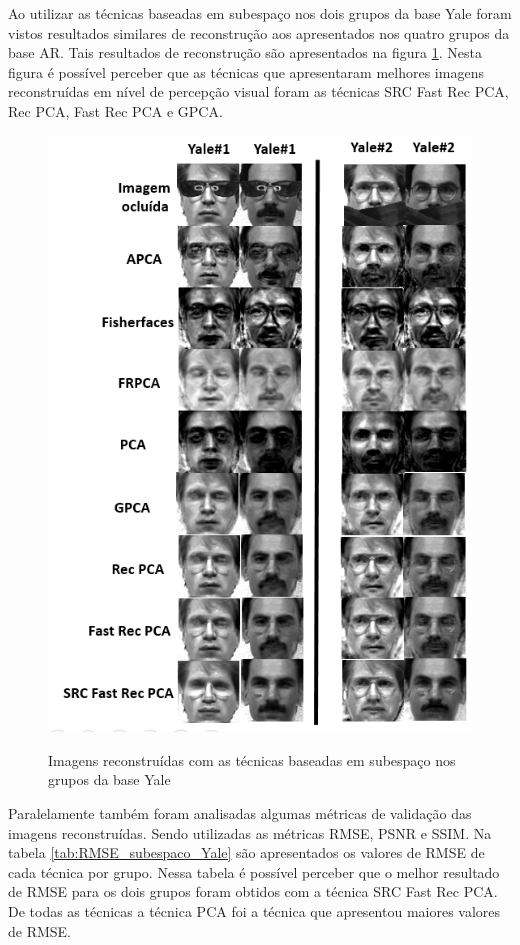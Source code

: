 Ao utilizar as técnicas baseadas em subespaço nos dois grupos da base Yale foram vistos resultados similares de reconstrução aos apresentados nos quatro grupos da base AR. Tais resultados de reconstrução são apresentados na figura \ref{fig:reconstrucao_subespaco_yale}. Nesta figura é possível perceber que as técnicas que apresentaram melhores imagens reconstruídas em nível de percepção visual foram as técnicas SRC Fast Rec PCA, Rec PCA, Fast Rec PCA e GPCA.

\begin{figure}[H]
\centering
\caption{Imagens reconstruídas com as técnicas baseadas em subespaço nos grupos da base Yale}
\includegraphics[scale=0.70]{imgs4/reconstrucoes_subespaco_yale}
\label{fig:reconstrucao_subespaco_yale}
\end{figure}

Paralelamente também foram analisadas algumas métricas de validação das imagens reconstruídas. Sendo utilizadas as métricas RMSE, PSNR e SSIM. Na tabela \ref{tab:RMSE_subespaco_Yale} são apresentados os valores de RMSE de cada técnica por grupo. Nessa tabela é possível perceber que o melhor resultado de RMSE para  os dois grupos foram obtidos com a técnica SRC Fast Rec PCA. De todas as técnicas a técnica PCA foi a  técnica que apresentou maiores valores de RMSE.

